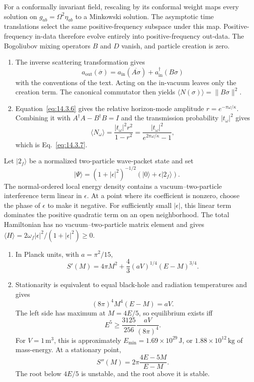 \begin{enumerate}[leftmargin=2.8em,itemsep=1.2em]
For a conformally invariant field, rescaling by its conformal weight maps every
solution on \(g_{ab}=\Omega^2\eta_{ab}\) to a Minkowski solution.  The asymptotic
time translations select the same positive-frequency subspace under this map.
Positive-frequency in-data therefore evolve entirely into positive-frequency
out-data.  The Bogoliubov mixing operators \(B\) and \(D\) vanish, and particle
creation is zero.

\begin{enumerate}[label=\alph*),leftmargin=2em]
\item The inverse scattering transformation gives
\[
 a_{\mathrm{out}}(\overline\sigma)=
 a_{\mathrm{in}}(\overline{A\sigma})+
 a_{\mathrm{in}}^\dagger(B\sigma)
\]
with the conventions of the text.  Acting on the in-vacuum leaves only the
creation term.  The canonical commutator then yields
\(\langle N(\sigma)\rangle=\|B\sigma\|^2\).

\item Equation~\eqref{eq:14.3.6} gives the relative horizon-mode amplitude
\(r=e^{-\pi\omega/\kappa}\).  Combining it with
\(A^\dagger A-B^\dagger B=I\) and the transmission probability
\(|t_\omega|^2\) gives
\[
 \langle N_\omega\rangle=
 \frac{|t_\omega|^2r^2}{1-r^2}
 =\frac{|t_\omega|^2}{e^{2\pi\omega/\kappa}-1},
\]
which is Eq.~\eqref{eq:14.3.7}.
\end{enumerate}

Let \(|2_f\rangle\) be a normalized two-particle wave-packet state and set
\[
 |\Psi\rangle=(1+|\epsilon|^2)^{-1/2}
 (|0\rangle+\epsilon|2_f\rangle).
\]
The normal-ordered local energy density contains a vacuum--two-particle
interference term linear in \(\epsilon\).  At a point where its coefficient is
nonzero, choose the phase of \(\epsilon\) to make it negative.  For sufficiently
small \(|\epsilon|\), this linear term dominates the positive quadratic term on
an open neighborhood.  The total Hamiltonian has no vacuum--two-particle matrix
element and gives \(\langle H\rangle=2\omega_f|\epsilon|^2/(1+|\epsilon|^2)\geq0\).

\begin{enumerate}[label=\alph*),leftmargin=2em]
\item In Planck units, with \(a=\pi^2/15\),
\[
 S'(M)=4\pi M^2+\frac43(aV)^{1/4}(E-M)^{3/4}.
\]

\item Stationarity is equivalent to equal black-hole and radiation
temperatures and gives
\[
 (8\pi)^4M^4(E-M)=aV.
\]
The left side has maximum at \(M=4E/5\), so equilibrium exists iff
\[
 E^5\geq\frac{3125}{256}\frac{aV}{(8\pi)^4}.
\]
For \(V=1\,\mathrm m^3\), this is approximately
\(E_{\min}=1.69\times10^{29}\,\mathrm J\), or
\(1.88\times10^{12}\,\mathrm{kg}\) of mass-energy.  At a stationary point,
\[
 S''(M)=2\pi\frac{4E-5M}{E-M}.
\]
The root below \(4E/5\) is unstable, and the root above it is stable.


\end{enumerate}
\end{enumerate}

